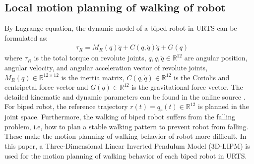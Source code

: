 \documentclass{ieeeaccess}
\begin{document}


\subsection{Local motion planning of walking of robot}
By Lagrange equation, the dynamic model of a biped robot in URTS can be formulated as:
\begin{equation} \label{eq:robot} 
    \begin{split}
        & \tau_R = M_R(q)\ddot{q} + C(q,\dot{q})\dot{q} + G(q)    
    \end{split}
\end{equation}
where $\tau_R$ is the total torque on revolute joints, $q,\dot{q},\ddot{q}\in\mathbb{R}^{12}$  are angular position, angular velocity, and angular acceleration vector of revolute joints, $M_R(q)\in\mathbb{R}^{12\times 12}$ is the inertia matrix, $C(q,\dot{q})\in\mathbb{R}^{12}$ is the Coriolis and centripetal force vector and $G(q)\in\mathbb{R}^{12}$ is the gravitational force vector. The detailed kinematic and dynamic parameters can be found in the online source \cite{ourrobot}. For biped robot, the reference trajectory $r(t)=q_r(t)\in\mathbb{R}^{12}$ is planned in the joint space. Furthermore, the walking of biped robot suffers from the falling problem, i.e, how to plan a stable walking pattern to prevent robot from falling. These make the motion planning of walking behavior of robot more difficult. In this paper, a Three-Dimensional Linear Inverted Pendulum Model (3D-LIPM) \cite{kajita2001real} is used for the motion planning of walking behavior of each biped robot in URTS.
\end{document}
